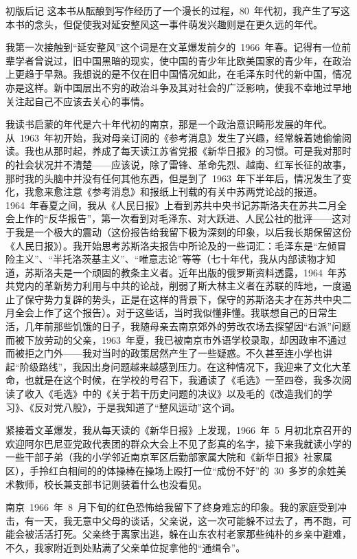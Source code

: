 \begin{pre-post-text}{初版后记}
这本书从酝酿到写作经历了一个漫长的过程，80~年代初，我产生了写这本书的念头，但促使我对延安整风这一事件萌发兴趣则是在更久远的年代。

我第一次接触到“延安整风”这个词是在文革爆发前夕的~1966~年春。记得有一位前辈学者曾说过，旧中国黑暗的现实，使中国的青少年比欧美国家的青少年，在政治上更趋于早熟。我想说的是不仅在旧中国情况如此，在毛泽东时代的新中国，情况亦是这样。新中国层出不穷的政治斗争及其对社会的广泛影响，使我不幸地过早地关注起自己不应该去关心的事情。

我读书启蒙的年代是六十年代初的南京，那是一个政治意识畸形发展的年代。从~1963~年初开始，我对母亲订阅的《参考消息》发生了兴趣，经常躲着她偷偷阅读。我也从那时起，养成了每天读江苏省党报《新华日报》的习惯。可是我对那时的社会状况并不清楚——应该说，除了雷锋、革命先烈、越南、红军长征的故事，那时我的头脑中并没有任何其他东西，但是到了~1963~年下半年后，情况发生了变化，我愈来愈注意《参考消息》和报纸上刊载的有关中苏两党论战的报道。1964~年春夏之间，我从《人民日报》上看到苏共中央书记苏斯洛夫在苏共二月全会上作的“反华报告”，第一次看到对毛泽东、对大跃进、人民公社的批评——这对于我是一个极大的震动（这份报告给我留下极为深刻的印象，以后我长期保留这份《人民日报》）。我开始思考苏斯洛夫报告中所论及的一些词汇：毛泽东是“左倾冒险主义”、“半托洛茨基主义”、“唯意志论”等等（七十年代，我从内部读物才知道，苏斯洛夫是一个顽固的教条主义者。近年出版的俄罗斯资料透露，1964~年苏共党内的革新势力利用与中共的论战，削弱了斯大林主义者在苏联的阵地，一度遏止了保守势力复辟的势头，正是在这样的背景下，保守的苏斯洛夫才在苏共中央二月全会上作了这个报告）。对于这些话，当时我似懂非懂。我联想自己的日常生活，几年前那些饥饿的日子，我随母亲去南京郊外的劳改农场去探望因“右派”问题而被下放劳动的父亲，1963~年夏，我已被南京市外语学校录取，却因政审不通过而被拒之门外——我对当时的政策居然产生了一些疑惑。不久甚至连小学也讲起“阶级路线”，我因出身问题越来越感到压力。在这种情况下，我迎来了文化大革命，也就是在这个时候，在学校的号召下，我通读了《毛选》一至四卷，我多次阅读了收入《毛选》中的《关于若干历史问题的决议》以及毛的《改造我们的学习》、《反对党八股》，于是我知道了“整风运动”这个词。

紧接着文革爆发，我从每天读的《新华日报》上发现，1966~年~5~月初北京召开的欢迎阿尔巴尼亚党政代表团的群众大会上不见了彭真的名字，接下来我就读小学的一些干部子弟（我的小学邻近南京军区后勤部家属大院和《新华日报》社家属区），手拎红白相间的的体操棒在操场上殴打一位“成份不好”的~30~多岁的余姓美术教师，校长兼支部书记则装着什么也没看见。

南京~1966~年~8~月下旬的红色恐怖给我留下了终身难忘的印象。我的家庭受到冲击，有一天，我无意中父母的谈话，父亲说，这一次可能躲不过去了，再不跑，可能会被活活打死。父亲终于离家出逃，躲在山东农村老家那些纯朴的乡亲中避难，不久，我家附近到处贴满了父亲单位捉拿他的“通缉令”。


\end{pre-post-text}
